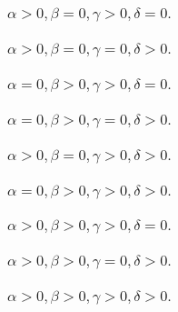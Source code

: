 \documentclass[12pt, a4paper]{article}
\begin{document}
\subsubsection{ $ \alpha > 0, \beta = 0, \gamma > 0, \delta = 0. $}
\subsubsection{ $ \alpha > 0, \beta = 0, \gamma = 0, \delta > 0. $}
\subsubsection{ $ \alpha = 0, \beta > 0, \gamma > 0, \delta = 0. $}
\subsubsection{ $ \alpha = 0, \beta > 0, \gamma = 0, \delta > 0. $}
\subsubsection{ $ \alpha > 0, \beta = 0, \gamma > 0, \delta > 0. $}
\subsubsection{ $ \alpha = 0, \beta > 0, \gamma > 0, \delta > 0. $}
\subsubsection{ $ \alpha > 0, \beta > 0, \gamma > 0, \delta = 0. $}
\subsubsection{ $ \alpha > 0, \beta > 0, \gamma = 0, \delta > 0. $}
\subsubsection{ $ \alpha > 0, \beta > 0, \gamma > 0, \delta > 0. $}
\end{document}
